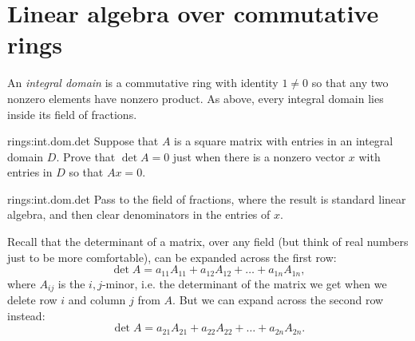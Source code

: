 \section{Linear algebra over commutative rings}
An \emph{integral domain} is a commutative ring with identity \(1\ne 0\) so that any two nonzero elements have nonzero product.
As above, every integral domain lies inside its field of fractions.
\begin{problem}{rings:int.dom.det}
Suppose that \(A\) is a square matrix with entries in an integral domain \(D\).
Prove that \(\det A=0\) just when there is a nonzero vector \(x\) with entries in \(D\) so that \(Ax=0\).
\end{problem}
\begin{answer}{rings:int.dom.det}
Pass to the field of fractions, where the result is standard linear algebra, and then clear denominators in the entries of \(x\).
\end{answer}
Recall that the determinant of a matrix, over any field (but think of real numbers just to be more comfortable), can be expanded across the first row:
\[
\det A = a_{11} A_{11} + a_{12} A_{12} + \dots + a_{1n} A_{1n},
\]
where \(A_{ij}\) is the \(i,j\)-minor, i.e. the determinant of the matrix we get when we delete row \(i\) and column \(j\) from \(A\).
But we can expand across the second row instead:
\[
\det A = a_{21} A_{21} + a_{22} A_{22} + \dots + a_{2n} A_{2n}.
\]

